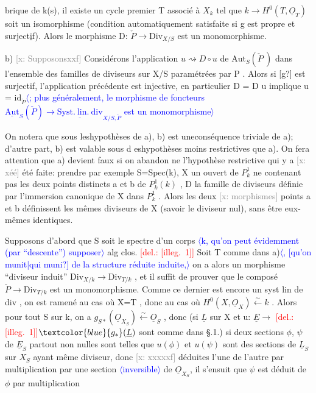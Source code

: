 \documentclass[11pt]{article}
\newcommand{\scanpage}[1]{\par\bigskip\noindent{\small\sffamily[scan #1]}\par}
\newcommand{\mspage}[1]{{\small\sffamily[p.\,#1]}}
\newcommand{\hand}[1]{\textcolor{blue}{#1}}
\newcommand{\inserted}[2][]{\textcolor{blue}{$\langle$#2$\rangle$}}
\newcommand{\deleted}[1]{\textcolor{red}{[\textsf{del.:} #1]}}
\newcommand{\xout}[1]{\textcolor{gray}{[\textsf{x:} #1]}}
\newcommand{\uline}[1]{\underline{#1}}
\newcommand{\unsure}[1]{[#1?]}
\newcommand{\illegible}[1]{[\textsf{illeg.\ #1}]}
\begin{document}
\clearpage
\scanpage{25/127}
\mspage{30}
brique de k(s), il existe un cycle premier T associé à $X_k$ tel que
$k \to H^0(T,\underline{O}_T)$ soit un isomorphisme (condition automatiquement satisfaite
si g est propre et surject\uline{i}f). Alors le morphisme D: $\check{P} \longrightarrow \mathrm{Div}_{X/S}$ est
un monomorphisme.

b) \xout{Supposonsxxf} Considérons l'application $u \rightsquigarrow D\circ u$ de
$\mathrm{Aut}_S(\check{P}\ )$ dans l'ensemble des familles de diviseurs sur X/S paramétrées
par P . Alors si \unsure{g} est surjectif, l'application précédente est injective,
en particulier D = D u implique u = $\mathrm{id}_{\check{P}}$\inserted{; plus généralement, le morphisme de foncteurs $\underline{\mathrm{Aut}}_S(\check{P}) \longrightarrow \underline{\mathrm{Syst.\ lin.\ div}}_{X/S,\check{P}}$ est un monomorphisme}

On notera que sous leshypothèses de a), b) est uneconséquence
triviale de a); d'autre part, b) est valable sous d eshypothèses moins
restrictives que a). On fera attention que a) devient faux si on abandon
ne l'hypothèse restrictive qui y a \xout{xéé} été faite: prendre par exemple
S=Spec(k), X un ouvert de $P^1_k$ ne contenant pas les deux points distincts
a et b de $P^1_k(k)$ , D la famille de diviseurs définie par l'immersion
canonique de X dans $P^1_k$ . Alors les deux \xout{morphismes} points a et b
définissent les mêmes diviseurs de X (savoir le diviseur nul), sans être
eux-mêmes identiques.

Supposons d'abord que S soit le spectre d'un corps \inserted{k, qu'on peut évidemment (par ``descente'') supposer} alg clos. \deleted{\illegible{1}}
Soit T comme dans a)\inserted{, \unsure{qu'on munit|qui muni} de la structure réduite induite,} on a alors un morphisme ``diviseur induit''
$\mathrm{Div}_{X/k} \longrightarrow \mathrm{Div}_{T/k}$ , et il suffit de prouver que le composé $\check{P} \longrightarrow \mathrm{Div}_{T/k}$
est un monomorphisme. Comme ce dernier est encore un syst lin de div ,
on est ramené au cas où X=T , donc au cas où $H^0(X,\underline{O}_X) \xleftarrow{\sim} k$ . Alors pour
tout S sur k, on a $g_{S*}(\underline{O}_{X_S}) \xleftarrow{\sim} \underline{O}_S$ , donc (si $\underline{L}$ sur X et u: $\underline{E} \to$ \deleted{\illegible{1}}$\hand{g_*}(\underline{L})$
sont comme dans §.1.) si deux sections $\phi$, $\psi$ de $\underline{E}_S$ partout non nulles
sont telles que $u(\phi)$ et $u(\psi)$ sont des sections de $\underline{L}_S$ sur $X_S$ ayant même
diviseur, donc \xout{xxxxxf} déduites l'une de l'autre par multiplication par
une section \inserted[typed]{inversible} de $\underline{O}_{X_S}$, il s'ensuit que $\psi$ est déduit de $\phi$ par multiplication
\end{document}
